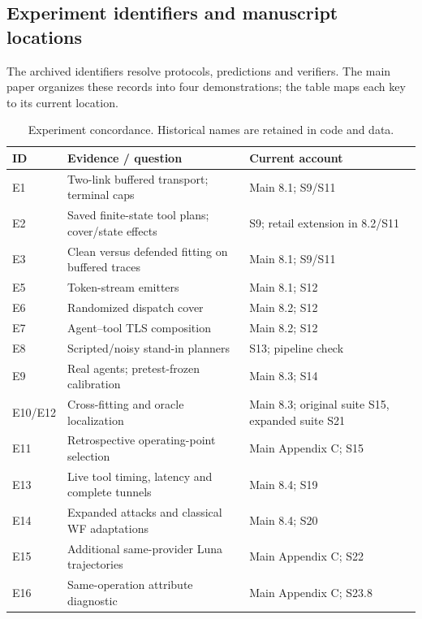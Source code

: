 \subsection{Experiment identifiers and manuscript locations}
The archived identifiers resolve protocols, predictions and verifiers. The main paper organizes these records into four demonstrations; the table maps each key to its current location.
\begin{table}[!ht]\centering\footnotesize
\caption{Experiment concordance. Historical names are retained in code and data.}\label{tab:experiment-concordance}
\begin{tabularx}{\columnwidth}{@{}lYY@{}}\toprule
ID & Evidence / question & Current account\\\midrule
E1 & Two-link buffered transport; terminal caps & Main 8.1; S9/S11\\
E2 & Saved finite-state tool plans; cover/state effects & S9; retail extension in 8.2/S11\\
E3 & Clean versus defended fitting on buffered traces & Main 8.1; S9/S11\\
E5 & Token-stream emitters & Main 8.1; S12\\
E6 & Randomized dispatch cover & Main 8.2; S12\\
E7 & Agent--tool TLS composition & Main 8.2; S12\\
E8 & Scripted/noisy stand-in planners & S13; pipeline check\\
E9 & Real agents; pretest-frozen calibration & Main 8.3; S14\\
E10/E12 & Cross-fitting and oracle localization & Main 8.3; original suite S15, expanded suite S21\\
E11 & Retrospective operating-point selection & Main Appendix C; S15\\
E13 & Live tool timing, latency and complete tunnels & Main 8.4; S19\\
E14 & Expanded attacks and classical WF adaptations & Main 8.4; S20\\
E15 & Additional same-provider Luna trajectories & Main Appendix C; S22\\
E16 & Same-operation attribute diagnostic & Main Appendix C; S23.8\\
\bottomrule\end{tabularx}\end{table}

